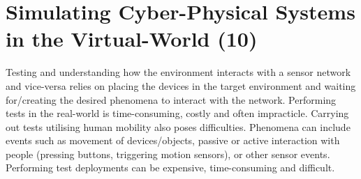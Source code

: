\chapter{Simulating Cyber-Physical Systems in the Virtual-World (10)}

Testing and understanding how the environment interacts with a sensor network and vice-versa relies on placing the devices in the target environment and waiting for/creating the desired phenomena to interact with the network. Performing tests in the real-world is time-consuming, costly and often impracticle. Carrying out tests utilising human mobility also poses difficulties. Phenomena can include events such as movement of devices/objects, passive or active interaction with people (pressing buttons, triggering motion sensors), or other sensor events. Performing test deployments can be expensive, time-consuming and difficult.



